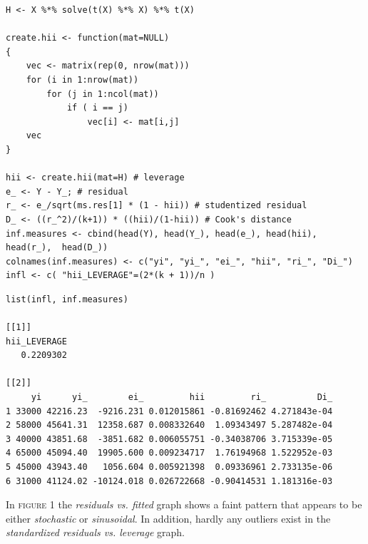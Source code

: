 \documentclass[10pt, twoside, openleft]{article}
\begin{document}
\begin{verbatim}
H <- X %*% solve(t(X) %*% X) %*% t(X)

create.hii <- function(mat=NULL)
{
	vec <- matrix(rep(0, nrow(mat)))
	for (i in 1:nrow(mat))
		for (j in 1:ncol(mat))
			if ( i == j)
				vec[i] <- mat[i,j] 
	vec
}

hii <- create.hii(mat=H) # leverage
e_ <- Y - Y_; # residual
r_ <- e_/sqrt(ms.res[1] * (1 - hii)) # studentized residual
D_ <- ((r_^2)/(k+1)) * ((hii)/(1-hii)) # Cook's distance
inf.measures <- cbind(head(Y), head(Y_), head(e_), head(hii), head(r_),  head(D_))
colnames(inf.measures) <- c("yi", "yi_", "ei_", "hii", "ri_", "Di_")
infl <- c( "hii_LEVERAGE"=(2*(k + 1))/n )
\end{verbatim}

\begin{verbatim}
list(infl, inf.measures)

[[1]]
hii_LEVERAGE
   0.2209302

[[2]]
     yi      yi_        ei_         hii         ri_          Di_
1 33000 42216.23  -9216.231 0.012015861 -0.81692462 4.271843e-04
2 58000 45641.31  12358.687 0.008332640  1.09343497 5.287482e-04
3 40000 43851.68  -3851.682 0.006055751 -0.34038706 3.715339e-05
4 65000 45094.40  19905.600 0.009234717  1.76194968 1.522952e-03
5 45000 43943.40   1056.604 0.005921398  0.09336961 2.733135e-06
6 31000 41124.02 -10124.018 0.026722668 -0.90414531 1.181316e-03
\end{verbatim}

\noindent
In \textsc{figure 1} the \emph{residuals vs. fitted} graph shows a faint pattern that
appears to be either \emph{stochastic} or \emph{sinusoidal}. In addition, hardly
any outliers exist in the \emph{standardized residuals vs. leverage} graph.
\bigskip
\end{document}
